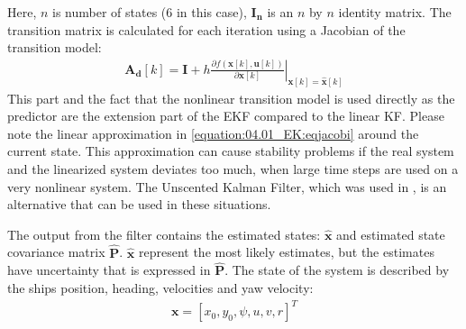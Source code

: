 
Here, \(n\) is number of states (6 in this case), \(\mathbf{I_n}\) is an $n$ by $n$ identity matrix.
The transition matrix is calculated for each iteration using a Jacobian of the transition model:
\begin{equation}\label{equation:04.01_EK:eqjacobi}
\begin{split}\mathbf{A_d}[k] = \mathbf{I} + h \left. \frac{\partial f \left(\mathbf{x}[k],\mathbf{u}[k] \right)}{\partial \mathbf{x}[k]} \right|_{\mathbf{x}[k]=\mathbf{\hat{x}}[k]}\end{split}
\end{equation}
This part and the fact that the nonlinear transition model is used directly as the predictor are the extension part of the EKF compared to the linear KF. Please note the linear approximation in \autoref{equation:04.01_EK:eqjacobi} around the current state. This approximation can cause stability problems if the real system and the linearized system deviates too much, when large time steps are used on a very nonlinear system. The Unscented Kalman Filter, which was used in \textcite{revestidoherreroTwostepIdentificationNonlinear2012}, is an alternative that can be used in these situations.

The output from the filter contains the estimated states: \(\mathbf{\hat{x}}\) and estimated state covariance matrix \(\mathbf{\hat{P}}\). \(\mathbf{\hat{x}}\) represent the most likely estimates, but the estimates have uncertainty that is expressed in \(\mathbf{\hat{P}}\).
The state of the system is described by the ships position, heading, velocities and yaw velocity:
\begin{equation}\label{equation:04.01_EK:eqstates}
\begin{split}\mathbf{x} = [x_0,y_0,\psi,u,v,r]^T\end{split}
\end{equation}

